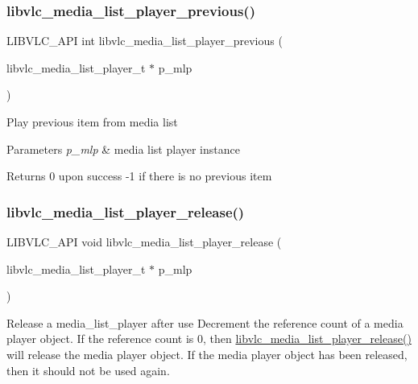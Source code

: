 \subsubsection{\texorpdfstring{libvlc\+\_\+media\+\_\+list\+\_\+player\+\_\+previous()}{libvlc\_media\_list\_player\_previous()}}
{\footnotesize\ttfamily L\+I\+B\+V\+L\+C\+\_\+\+A\+PI int libvlc\+\_\+media\+\_\+list\+\_\+player\+\_\+previous (\begin{DoxyParamCaption}\item[{libvlc\+\_\+media\+\_\+list\+\_\+player\+\_\+t $\ast$}]{p\+\_\+mlp }\end{DoxyParamCaption})}

Play previous item from media list


\begin{DoxyParams}{Parameters}
{\em p\+\_\+mlp} & media list player instance \\
\hline
\end{DoxyParams}
\begin{DoxyReturn}{Returns}
0 upon success -\/1 if there is no previous item 
\end{DoxyReturn}
\mbox{\label{group__libvlc__media__list__player_ga50768b609de18646d8339c31bd57d41d}} 
\subsubsection{\texorpdfstring{libvlc\+\_\+media\+\_\+list\+\_\+player\+\_\+release()}{libvlc\_media\_list\_player\_release()}}
{\footnotesize\ttfamily L\+I\+B\+V\+L\+C\+\_\+\+A\+PI void libvlc\+\_\+media\+\_\+list\+\_\+player\+\_\+release (\begin{DoxyParamCaption}\item[{libvlc\+\_\+media\+\_\+list\+\_\+player\+\_\+t $\ast$}]{p\+\_\+mlp }\end{DoxyParamCaption})}

Release a media\+\_\+list\+\_\+player after use Decrement the reference count of a media player object. If the reference count is 0, then \hyperlink{group__libvlc__media__list__player_ga50768b609de18646d8339c31bd57d41d}{libvlc\+\_\+media\+\_\+list\+\_\+player\+\_\+release()} will release the media player object. If the media player object has been released, then it should not be used again.


